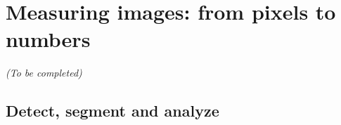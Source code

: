 \section{Measuring images: from pixels to numbers}
\label{sec:computation_biology}

\begin{center}
	\textit{(To be completed)}
\end{center}


\subsection{Detect, segment and analyze}
\label{subsec:intro_pipeline}





